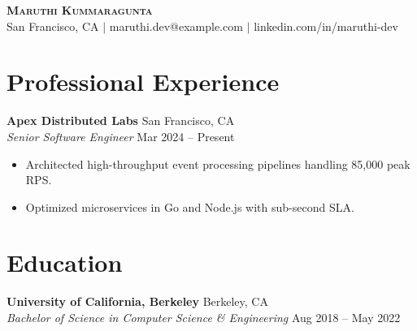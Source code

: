 \documentclass[letterpaper,11pt]{article}
\begin{document}
\begin{center}
    \textbf{\Huge \scshape Maruthi Kummaragunta} \\ \vspace{2pt}
    \small San Francisco, CA $|$ maruthi.dev@example.com $|$ linkedin.com/in/maruthi-dev
\end{center}

\section*{Professional Experience}

\textbf{Apex Distributed Labs} \hfill San Francisco, CA \\
\emph{Senior Software Engineer} \hfill Mar 2024 -- Present \\
\begin{itemize}[leftmargin=0.15in, label={$\bullet$}]
    \item Architected high-throughput event processing pipelines handling 85,000 peak RPS.
    \item Optimized microservices in Go and Node.js with sub-second SLA.
\end{itemize}

\section*{Education}

\textbf{University of California, Berkeley} \hfill Berkeley, CA \\
\emph{Bachelor of Science in Computer Science \& Engineering} \hfill Aug 2018 -- May 2022
\end{document}

